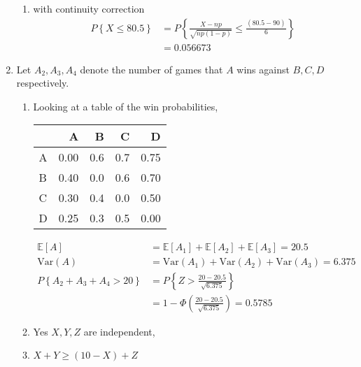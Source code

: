 \begin{enumerate}
\begin{enumerate}
			\item with continuity correction\\
			\begin{align}
				P \left\{X \leq 80.5 \right\} &= P \left\{ \frac{X - np}{\sqrt{np(1-p)}} \leq \frac{(80.5 - 90)}{6} \right\} \nonumber \\
				&= 0.056673
			\end{align}
		\end{enumerate}
	
	
	\item Let $ A_2, A_3, A_4 $ denote the number of games that $ A $ wins against $ B, C, D $ respectively.
	
		\begin{enumerate}
			\item Looking at a table of the win probabilities,
			
			\begin{table}[H]
				\centering
				\begin{tabular}{@{}l|rrrr@{}}
					\toprule
					{} &     A &    B &    C &     D \\
					\midrule
					A &  0.00 &  0.6 &  0.7 &  0.75 \\
					B &  0.40 &  0.0 &  0.6 &  0.70 \\
					C &  0.30 &  0.4 &  0.0 &  0.50 \\
					D &  0.25 &  0.3 &  0.5 &  0.00 \\
					\bottomrule
				\end{tabular}
			\end{table}
			
			\begin{align}
				\mathbb{E}[A] &= \mathbb{E}[A_1] + \mathbb{E}[A_2] + \mathbb{E}[A_3] = 20.5 \nonumber \\
				\mathrm{Var}(A) &= \mathrm{Var}(A_1) + \mathrm{Var}(A_2) + \mathrm{Var}(A_3) = 6.375 \nonumber \\
				P\left\{ A_2 + A_3 + A_4 > 20 \right\} &= P \left\{ Z > \frac{20 - 20.5}{\sqrt{6.375}} \right\} \nonumber \\
				&= 1 - \Phi \left( \frac{20 - 20.5}{\sqrt{6.375}} \right) = 0.5785
			\end{align}
			
			\item Yes $ X, Y, Z $ are independent,
			
			\item $ X + Y \geq (10-X) + Z $ \\
			

\end{enumerate}
\end{enumerate}
